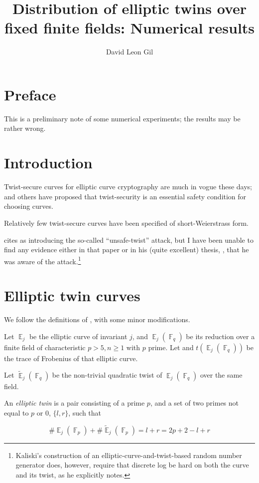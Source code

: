 \documentclass[11pt,fleqn]{article}
\title{Distribution of elliptic twins over fixed finite fields: Numerical results}
\author{David Leon Gil}
\newcommand{\Ej}{\ensuremath{\BbbE_j} }
\newcommand{\Ejfq}{\ensuremath{\BbbE_j(\BbbF_q)} }
\newcommand{\Ejfqt}{\ensuremath{\widetilde{\BbbE}_j(\BbbF_q)} }
\newcommand{\Ejfp}{\ensuremath{\BbbE_j(\BbbF_p)} }
\newcommand{\Ejfpt}{\ensuremath{\widetilde{\BbbE}_j(\BbbF_p)} }
\begin{document}
\maketitle

\section{Preface}

This is a preliminary note of some numerical experiments; the results
may be rather wrong.

\section{Introduction}

Twist-secure curves for elliptic curve cryptography are much in vogue
these days; \cite{curve25519} and others have proposed that twist-security
is an essential safety condition for choosing curves.

Relatively few twist-secure curves have been specified of short-Weierstrass
form. 

\cite{curve25519} cites \cite{KaliskiJCryptology} as introducing the
so-called ``unsafe-twist'' attack, but I have been unable to find any
evidence either in that paper or in his (quite excellent) thesis,
\cite{KaliskiThesis}, that he was aware of the attack.\footnote{Kaliski's
construction of an elliptic-curve-and-twist-based random number generator
does, however, require that discrete log be hard on both the curve and its
twist, as he explicitly notes.}

\section{Elliptic twin curves}

We follow the definitions of \autocite{ShparlinskiSutantyo}, with some minor
modifications.

Let $\Ej$ be the elliptic curve of invariant $j$, and $\Ejfq$ be its reduction
over a finite field of characteristic $p > 5, n \geq 1$ with $p$ prime. Let
and $t(\Ejfq)$ be the trace of Frobenius of that elliptic curve.

Let $\Ejfqt$ be the non-trivial quadratic twist of $\Ejfq$ over the same field.

An \emph{elliptic twin} is a pair consisting of a prime $p$, and a set of two
primes not equal to $p$ or $0$, $\lbrace l, r \rbrace$, such that

\begin{equation}
\#\Ejfp + \#\Ejfpt = l + r = 2 p + 2 - l + r
\end{equation}
\end{document}
